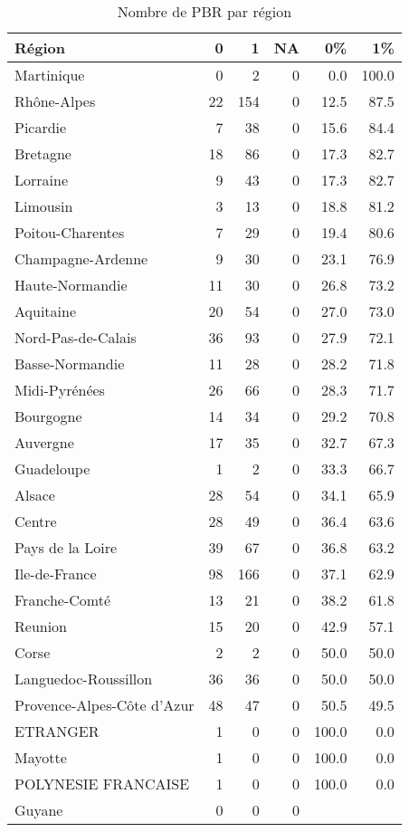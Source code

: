 \documentclass[11pt,a4paper]{article}\usepackage[]{graphicx}\usepackage[]{color}
\begin{document}
\begin{table}[H]
\centering
\begin{tabular}{lrrrrr}
  \hline
Région & 0 & 1 & NA & 0\% & 1\% \\ 
  \hline
Martinique & 0 & 2 & 0 & 0.0 & 100.0 \\ 
  Rhône-Alpes & 22 & 154 & 0 & 12.5 & 87.5 \\ 
  Picardie & 7 & 38 & 0 & 15.6 & 84.4 \\ 
  Bretagne & 18 & 86 & 0 & 17.3 & 82.7 \\ 
  Lorraine & 9 & 43 & 0 & 17.3 & 82.7 \\ 
  Limousin & 3 & 13 & 0 & 18.8 & 81.2 \\ 
  Poitou-Charentes & 7 & 29 & 0 & 19.4 & 80.6 \\ 
  Champagne-Ardenne & 9 & 30 & 0 & 23.1 & 76.9 \\ 
  Haute-Normandie & 11 & 30 & 0 & 26.8 & 73.2 \\ 
  Aquitaine & 20 & 54 & 0 & 27.0 & 73.0 \\ 
  Nord-Pas-de-Calais & 36 & 93 & 0 & 27.9 & 72.1 \\ 
  Basse-Normandie & 11 & 28 & 0 & 28.2 & 71.8 \\ 
  Midi-Pyrénées & 26 & 66 & 0 & 28.3 & 71.7 \\ 
  Bourgogne & 14 & 34 & 0 & 29.2 & 70.8 \\ 
  Auvergne & 17 & 35 & 0 & 32.7 & 67.3 \\ 
  Guadeloupe & 1 & 2 & 0 & 33.3 & 66.7 \\ 
  Alsace & 28 & 54 & 0 & 34.1 & 65.9 \\ 
  Centre & 28 & 49 & 0 & 36.4 & 63.6 \\ 
  Pays de la Loire & 39 & 67 & 0 & 36.8 & 63.2 \\ 
  Ile-de-France & 98 & 166 & 0 & 37.1 & 62.9 \\ 
  Franche-Comté & 13 & 21 & 0 & 38.2 & 61.8 \\ 
  Reunion & 15 & 20 & 0 & 42.9 & 57.1 \\ 
  Corse & 2 & 2 & 0 & 50.0 & 50.0 \\ 
  Languedoc-Roussillon & 36 & 36 & 0 & 50.0 & 50.0 \\ 
  Provence-Alpes-Côte d'Azur & 48 & 47 & 0 & 50.5 & 49.5 \\ 
  ETRANGER & 1 & 0 & 0 & 100.0 & 0.0 \\ 
  Mayotte & 1 & 0 & 0 & 100.0 & 0.0 \\ 
  POLYNESIE FRANCAISE & 1 & 0 & 0 & 100.0 & 0.0 \\ 
  Guyane & 0 & 0 & 0 &  &  \\ 
   \hline
\end{tabular}
\caption{Nombre de PBR par région} 
\end{table}
\end{document}

